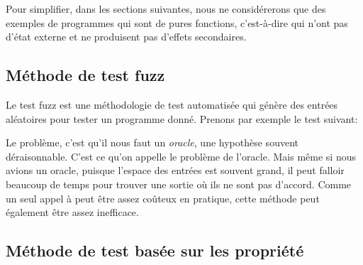 Pour simplifier, dans les sections suivantes, nous ne considérerons que des exemples de programmes qui sont de pures fonctions, c'est-à-dire qui n'ont pas d'état externe et ne produisent pas d'effets secondaires.

\subsection{Méthode de test fuzz}

Le test fuzz est une méthodologie de test automatisée qui génère des entrées aléatoires pour tester un programme donné. Prenons par exemple le test suivant:
%
%
Le problème, c'est qu'il nous faut un \textit{oracle}, une hypothèse souvent déraisonnable. C'est ce qu'on appelle le problème de l'oracle. Mais même si nous avions un oracle, puisque l'espace des entrées est souvent grand, il peut falloir beaucoup de temps pour trouver une sortie où ils ne sont pas d'accord. Comme un seul appel à  peut être assez coûteux en pratique, cette méthode peut également être assez inefficace.

\subsection{Méthode de test basée sur les propriété}\label{subsec:property-based-testing}

